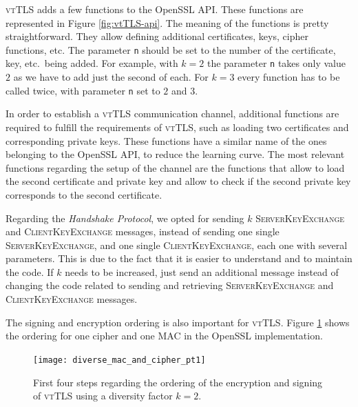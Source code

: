 \documentclass{sig-alternate-05-2015}
\newcommand{\msg}[1]{\textsc{{#1}}}
\begin{document}
\textsc{vtTLS} adds a few functions to the OpenSSL API. These functions are represented in Figure \ref{fig:vtTLS-api}. The meaning of the functions is pretty straightforward. They allow defining additional certificates, keys, cipher functions, etc. The parameter \texttt{n} should be set to the number of the certificate, key, etc.~being added. For example, with $k=2$ the parameter \texttt{n} takes only value $2$ as we have to add just the second of each. For $k=3$ every function has to be called twice, with parameter \texttt{n} set to $2$ and $3$.


In order to establish a \textsc{vtTLS} communication channel, additional functions are required to fulfill the requirements of \textsc{vtTLS}, such as loading two certificates and corresponding private keys. These functions have a similar name of the ones belonging to the OpenSSL API, to reduce the learning curve.
The most relevant functions regarding the setup of the channel are the functions that allow to load the second certificate and private key and allow to check if the second private key corresponds to the second certificate.

Regarding the \textit{Handshake Protocol}, we opted for sending $k$ \msg{ServerKeyExchange} and \msg{ClientKeyExchange} messages, instead of sending one single \msg{ServerKeyExchange}, and one single \msg{ClientKeyExchange}, each one with several parameters. This is due to the fact that it is easier to understand and to maintain the code. If $k$ needs to be increased, just send an additional message instead of changing the code related to sending and retrieving \msg{ServerKeyExchange} and \msg{ClientKeyExchange} messages.

The signing and encryption ordering is also  important for \textsc{vtTLS}. Figure \ref{fig:diverse-mac-and-cipher-pt1} shows the ordering for one cipher and one MAC in the OpenSSL implementation.

\begin{figure}[t]
\texttt{[image: diverse\_mac\_and\_cipher\_pt1]}
\centering
\caption{First four steps regarding the ordering of the encryption and signing of \textsc{vtTLS} using a diversity factor $k = 2$.}
\label{fig:diverse-mac-and-cipher-pt1}
\end{figure}

\end{document}
